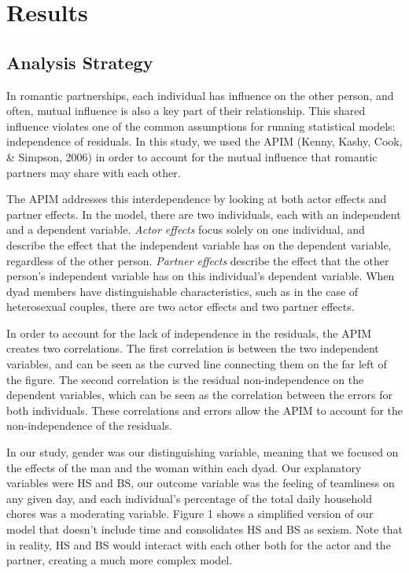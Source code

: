 \documentclass[
  man]{apa6}
\begin{document}
\hypertarget{results}{%
\section{Results}\label{results}}

\hypertarget{analysis-strategy}{%
\subsection{Analysis Strategy}\label{analysis-strategy}}

In romantic partnerships, each individual has influence on the other person, and often, mutual influence is also a key part of their relationship. This shared influence violates one of the common assumptions for running statistical models: independence of residuals. In this study, we used the APIM (Kenny, Kashy, Cook, \& Simpson, 2006) in order to account for the mutual influence that romantic partners may share with each other.

The APIM addresses this interdependence by looking at both actor effects and partner effects. In the model, there are two individuals, each with an independent and a dependent variable. \emph{Actor effects} focus solely on one individual, and describe the effect that the independent variable has on the dependent variable, regardless of the other person. \emph{Partner effects} describe the effect that the other person's independent variable has on this individual's dependent variable. When dyad members have distinguishable characteristics, such as in the case of heterosexual couples, there are two actor effects and two partner effects.

In order to account for the lack of independence in the residuals, the APIM creates two correlations. The first correlation is between the two independent variables, and can be seen as the curved line connecting them on the far left of the figure. The second correlation is the residual non-independence on the dependent variables, which can be seen as the correlation between the errors for both individuals. These correlations and errors allow the APIM to account for the non-independence of the residuals.

In our study, gender was our distinguishing variable, meaning that we focused on the effects of the man and the woman within each dyad. Our explanatory variables were HS and BS, our outcome variable was the feeling of teamliness on any given day, and each individual's percentage of the total daily household chores was a moderating variable. Figure 1 shows a simplified version of our model that doesn't include time and consolidates HS and BS as sexism. Note that in reality, HS and BS would interact with each other both for the actor and the partner, creating a much more complex model.
\end{document}
